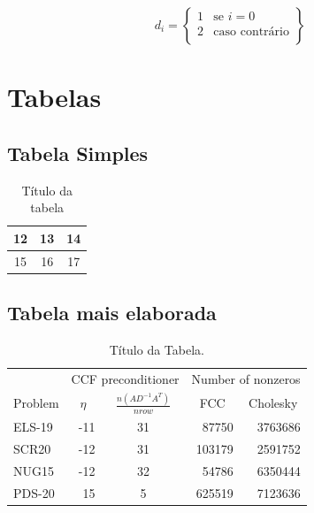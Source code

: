 \documentclass[12pt,fleqn]{article}
\begin{document}
\[
d_i=\left \{
\begin{array}{cc}
1 & \mbox{se } i=0 \\
2 & \mbox{caso contrário}\\
\end{array}
\right \}
\]




\clearpage

\section{Tabelas}
\label{sec:tab}


\subsection{Tabela Simples}
\begin{table}[htb]
\begin{center}
		\begin{tabular}{|c|c|c|}\hline
		12  & 13 & 14 \\\hline
		15  & 16 & 17 \\\hline
		\end{tabular}
\label{tab:Tabela1}
\caption{Título da tabela}
\end{center}
\end{table}


\subsection{Tabela mais elaborada}
\begin{table}[htb]
\begin{center}
\begin{tabular}{|l|r|c|r|r|} \hline
            & \multicolumn{2}{|c|}{{CCF preconditioner}} & \multicolumn{2}{|c|}{{Number of nonzeros}} \\ \cline{2-5}
{Problem}   & \multicolumn{1}{|c|}{$\eta$}  & \multicolumn{1}{|c|}{$ \frac{n(AD^{-1}A^T)}{nrow}$} & \multicolumn{1}{|c|}{FCC} & \multicolumn{1}{|c|}{Cholesky}  \\ \hline \hline
ELS-19    &  -11 & 31 &  87750  & 3763686  \\\hline
SCR20     &  -12 & 31 &  103179 & 2591752  \\\hline
NUG15     &  -12 & 32 &  54786  & 6350444 \\\hline
PDS-20    &   15 & 5  &  625519 & 7123636\\\hline
\end{tabular}
\caption{Título da Tabela.}
\label{tabn}
\end{center}
\end{table}
\end{document}
